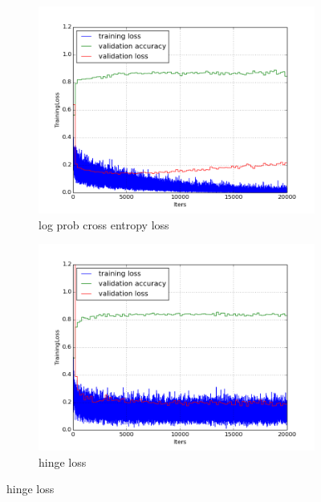 \documentclass[a4paper,11pt]{article}
\begin{document}
\begin{figure}
    \centering
    \begin{minipage}[b]{\textwidth}
      \begin{subfigure}{.5\textwidth} 
        \centering
        \includegraphics[scale=0.4]{images/plot_clampdet_none.png}
        \caption{log prob cross entropy loss}\label{fig:2a}
      \end{subfigure}%
      \begin{subfigure}{.5\textwidth} 
        \centering
        \includegraphics[scale=0.4]{images/plot_clampdet_linSVM.png}
        \caption{hinge loss}\label{fig:2b}
      \end{subfigure} \par \vspace*{20pt} %
      \caption{hinge loss}\label{fig:2}
    \end{minipage}%
    \label{f42}
\end{figure}
\end{document}
